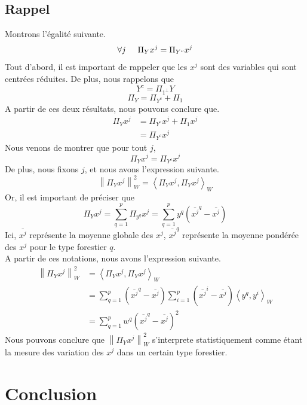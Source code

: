 \documentclass{article}
\begin{document}
\subsection{Rappel}
Montrons l'égalité suivante. \\
\[
\forall j \hspace{0.5cm} \Pi_Y x^j = \Pi_{Y^c} x^j
\]
Tout d'abord, il est important de rappeler que les $x^j$ sont des variables qui sont
centrées réduites. De plus, nous rappelons que 
\[
Y^c = \Pi_{1^\perp} Y 
\]
\[
\Pi_Y = \Pi_{Y^c} + \Pi_1
\]
A partir de ces deux résultats, nous pouvons conclure que. \\
\begin{align*}
    \Pi_Y x^j & = \Pi_{Y^c} x^j + \Pi_1 x^j \\
    &= \Pi_{Y^c} x^j
\end{align*}
Nous venons de montrer que pour tout $j$, 
\[
\Pi_Y x^j = \Pi_{Y^c} x^j
\]
De plus, nous fixons $j$, et nous avons l'expression suivante.
\[
\left\lVert \Pi_Y x^j \right\rVert^2 _W = \left\langle \Pi_Y x^j,\Pi_Y x^j\right\rangle_W
\]
Or, il est important de préciser que
\[
\Pi_Y x^j=\sum_{q = 1}^{p}\Pi_{y^q} x^j=\sum_{q = 1}^{p}y^q( \overline{x^j}^q - {\overline{x^j}} )  
\]
Ici, $\overline{x^j}$ représente la moyenne globale des $x^j$, $\overline{x^j}^q$ représente la moyenne pondérée des $x^j$ pour le type forestier $q$.\\
A partir de ces notations, nous avons l'expression suivante.
\begin{align*}
    \left\lVert \Pi_Y x^j \right\rVert^2 _W &= \left\langle \Pi_Y x^j,\Pi_Y x^j\right\rangle_W \\
     &=  \sum_{q = 1}^{p}( \overline{x^j}^q - {\overline{x^j}} ) \sum_{ i= 1}^{p}( \overline{x^j}^i - {\overline{x^j}} )\left\langle y^q,y^i\right\rangle_W \\
     &= \sum_{q = 1}^{p}w^q( \overline{x^j}^q - {\overline{x^j}} )^2
\end{align*}
Nous pouvons conclure que $\left\lVert \Pi_Y x^j \right\rVert^2 _W$ s'interprete statistiquement comme
étant la mesure des variation des $x^j$ dans un certain type forestier.
\newpage
\section{Conclusion}
\end{document}
